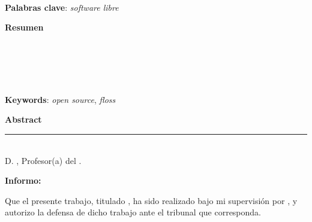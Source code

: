 \thispagestyle{empty}

\begin{center}
{\large\bfseries \titulo \\ \subtitulo }\\
\end{center}
\begin{center}
\titulo \\
\end{center}


\vspace{0.5cm}
\noindent\textbf{Palabras clave}: \textit{software libre}
\vspace{0.7cm}

\noindent\textbf{Resumen}\\
	

\cleardoublepage

\begin{center}
	{\large\bfseries \tituloingles \\ \subtituloingles}\\
\end{center}
\begin{center}
	\autor\\
\end{center}
\vspace{0.5cm}
\noindent\textbf{Keywords}: \textit{open source}, \textit{floss}
\vspace{0.7cm}

\noindent\textbf{Abstract}\\


\cleardoublepage

\thispagestyle{empty}

\noindent\rule[-1ex]{\textwidth}{2pt}\\[4.5ex]

D. \textbf{\tutor}, Profesor(a) del \departamento.

\vspace{0.5cm}

\textbf{Informo:}

\vspace{0.5cm}

Que el presente trabajo, titulado \textit{\textbf{\titulo}},
ha sido realizado bajo mi supervisión por \textbf{\autor}, y autorizo la defensa de dicho trabajo ante el tribunal
que corresponda.

\vspace{0.5cm}

